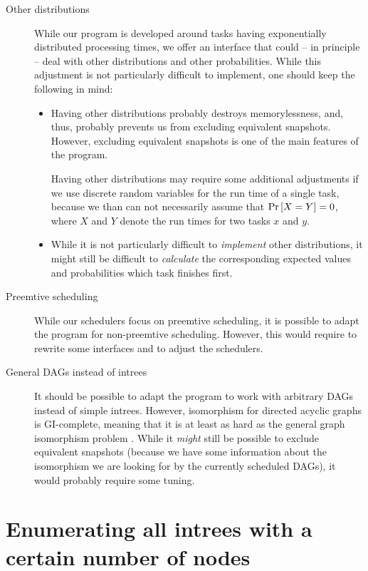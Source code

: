 \begin{description}
\item[Other distributions] While our program is developed around tasks having exponentially distributed processing times, we offer an interface that could -- in principle -- deal with other distributions and other probabilities. While this adjustment is not particularly difficult to implement, one should keep the following in mind:
  \begin{itemize}
  \item Having other distributions probably destroys memorylessness, and, thus, probably prevents us from excluding equivalent snapshots. However, excluding equivalent snapshots is one of the main features of the program.

    Having other distributions may require some additional adjustments if we use discrete random variables for the run time of a single task, because we than can not necessarily assume that $\operatorname{Pr}\left[X = Y\right] = 0$, where $X$ and $Y$ denote the run times for two tasks $x$ and $y$.
  \item While it is not particularly difficult to \emph{implement} other distributions, it might still be difficult to \emph{calculate} the corresponding expected values and probabilities which task finishes first.
  \end{itemize}
\item[Preemtive scheduling] While our schedulers focus on preemtive scheduling, it is possible to adapt the program for non-preemtive scheduling. However, this would require to rewrite some interfaces and to adjust the schedulers.
\item[General DAGs instead of intrees] It should be possible to adapt the program to work with arbitrary DAGs instead of simple intrees. However, isomorphism for directed acyclic graphs is GI-complete, meaning that it is at least as hard as the general graph isomorphism problem \cite{graphisomorphismproblem}. While it \emph{might} still be possible to exclude equivalent snapshots (because we have some information about the isomorphism we are looking for by the currently scheduled DAGs), it would probably require some tuning.
\end{description}

\section{Enumerating all intrees with a certain number of nodes}
\label{sec:enumerating-all-intrees}

